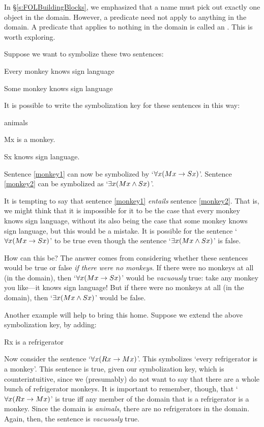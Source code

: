 In \S\ref{s:FOLBuildingBlocks}, we emphasized that a name must pick out exactly one object in the domain. However, a predicate need not apply to anything in the domain. A predicate that applies to nothing in the domain is called an . This is worth exploring.


Suppose we want to symbolize these two sentences:
	\begin{earg}
		\item[\ex{monkey1}] Every monkey knows sign language
		\item[\ex{monkey2}] Some monkey knows sign language
	\end{earg}
It is possible to write the symbolization key for these sentences in this way:
	\begin{ekey}
		\item[\text{domain}] animals
		\item[Mx]  is a monkey.
		\item[Sx]  knows sign language.
	\end{ekey}
Sentence \ref{monkey1} can now be symbolized by `$\forall x(Mx \rightarrow Sx)$'. Sentence \ref{monkey2} can be symbolized as `$\exists x(Mx \wedge Sx)$'.

It is tempting to say that sentence \ref{monkey1} \emph{entails} sentence \ref{monkey2}. That is, we might think that it is impossible for it to be the case that every monkey knows sign language, without its also being the case that some monkey knows sign language, but this would be a mistake. It is possible for the sentence `$\forall x(Mx \rightarrow Sx)$' to be true even though the sentence `$\exists x(Mx \wedge Sx)$' is false.

How can this be? The answer comes from considering whether these sentences would be true or false \emph{if there were no monkeys}. If there were no monkeys at all (in the domain), then `$\forall x(Mx \rightarrow Sx)$' would be \emph{vacuously} true: take any monkey you like---it knows sign language! But if there were no monkeys at all (in the domain), then `$\exists x(Mx \wedge Sx)$' would be false.

Another example will help to bring this home. Suppose we extend the above symbolization key, by adding:
	\begin{ekey}
		\item[Rx]  is a refrigerator
	\end{ekey}
Now consider the sentence `$\forall x(Rx \rightarrow Mx)$'. This symbolizes `every refrigerator is a monkey'. This sentence is true, given our symbolization key, which is counterintuitive, since we (presumably) do not want to say that there are a whole bunch of refrigerator monkeys. It is important to remember, though, that `$\forall x(Rx \rightarrow Mx)$' is true iff any member of the domain that is a refrigerator is a monkey. Since the domain is \emph{animals}, there are no refrigerators in the domain. Again, then, the sentence is \emph{vacuously} true. 

